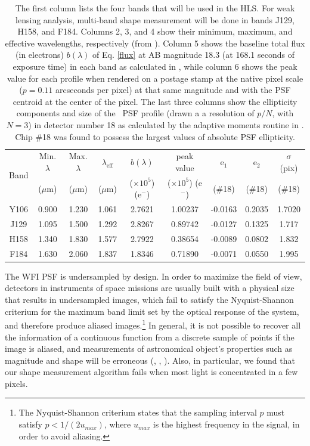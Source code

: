 \documentclass[preprint]{aastex}
\begin{document}
\begin{table}[!htb]
\centering
\begin{tabular}{ |c| c | c| c| c| c| c | c| c|}
\hline
\multirow{2}{*}{Band} & Min. $\lambda$ & Max. $\lambda$ & $\lambda_{\text{eff}}$ & $b(\lambda)$ & peak value  & e$_1$ & e$_2$ & $\sigma$ (pix) \\
& ($\mu$m) & ($\mu$m) & ($\mu$m) & ($\times10^5$) (e$^{-}$) & ($\times 10^{5}$) (e$^{-}$) & (\#18) & (\#18) & (\#18)  \\
\hline 
Y106 & 0.900 & 1.230 & 1.061 & 2.7621 &  1.00237  &-0.0163  & 0.2035 & 1.7020 \\
J129  & 1.095 & 1.500 & 1.292 & 2.8267 &  0.89742 & -0.0127  & 0.1325 & 1.717 \\
H158 & 1.340 & 1.830 & 1.577 & 2.7922 &  0.38654 & -0.0089 & 0.0802 & 1.832 \\
F184 & 1.630 & 2.060 & 1.837 & 1.8346 &  0.71890 & -0.0071 & 0.0550 & 1.995 \\
\hline
\end{tabular}
\caption{The first column lists the four bands that will be used in the HLS. For weak lensing analysis, multi-band shape measurement will be done in bands J129, H158, and F184. Columns 2, 3, and 4 show their minimum, maximum, and effective wavelengths, respectively (from \citealt{kannawadi15}). Column 5 shows the baseline total flux (in electrons) $b(\lambda)$ of Eq. \ref{flux} at AB magnitude 18.3 (at 168.1 seconds of exposure time) in each band as calculated in \gs, while column 6 shows the peak value for each profile when rendered on a postage stamp at the native pixel scale ($p=0.11$ arcseconds per pixel) at that same magnitude and with the PSF centroid at the center of the pixel. The last three columns show the ellipticity components and size of the \wfa\ PSF profile (drawn a a resolution of $p/N$, with $N=3$) in detector number 18 as calculated by the adaptive moments routine in \gs. Chip \#18 was found to possess the largest values of absolute PSF ellipticity.}
\label{table1}
\end{table}

The WFI PSF is undersampled by design. In order to maximize the field of view, detectors in instruments of space missions are usually built with a physical size that results in undersampled images, which fail to satisfy the Nyquist-Shannon criterium for the maximum band limit set by the optical response of the system, and therefore produce aliased images.\footnote{The Nyquist-Shannon criterium states that the sampling interval $p$ must satisfy $p < 1/(2 u_{max})$, where $u_{max}$ is the highest frequency in the signal, in order to avoid aliasing.} In general, it is not possible to recover all the information of a continuous function from a discrete sample of points if the image is aliased, and measurements of astronomical object's properties such as magnitude and shape will be erroneous (\citealt{lauer99a}, \citealt{fruchter11}, \citealt{rhodes07}). Also, in particular, we found that our shape measurement algorithm fails when most light is concentrated in a few pixels.
\end{document}
